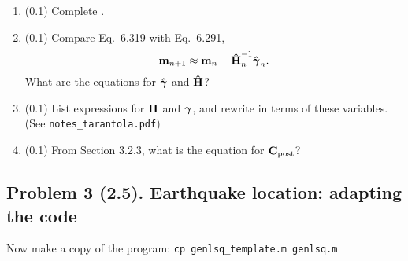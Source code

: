\documentclass[11pt,titlepage,fleqn]{article}
\begin{document}
\begin{enumerate}
\begin{enumerate}
\vspace{1cm}

\item (0.1) Complete .

\item (0.1) Compare Eq.~6.319 with Eq.~6.291,
%
\begin{equation}
\mbox{${\bf m}$}_{n+1} \approx \mbox{${\bf m}$}_{n} - \mbox{\boldmath{$\hat{\rm H}$}}^{-1}_n \mbox{\boldmath{$\hat{\gamma}$}}_n.
\label{mn}
\end{equation}
%
What are the equations for $\mbox{\boldmath{$\hat{\gamma}$}}$ and $\mbox{\boldmath{$\hat{\rm H}$}}$?

\vspace{1cm}

\item (0.1) List expressions for $\mbox{${\bf H}$}$ and $\mbox{\boldmath $\bf \gamma$}$, and rewrite  in terms of these variables. (See \verb+notes_tarantola.pdf+)

\vspace{1cm}

\item (0.1) From Section 3.2.3, what is the equation for $\mbox{${\bf C}$}_{\rm post}$?

\end{enumerate}

\end{enumerate}


\clearpage\pagebreak
\subsection*{Problem 3 (2.5). Earthquake location: adapting the code}

Now make a copy of the program: \verb+cp genlsq_template.m genlsq.m+
\end{document}
